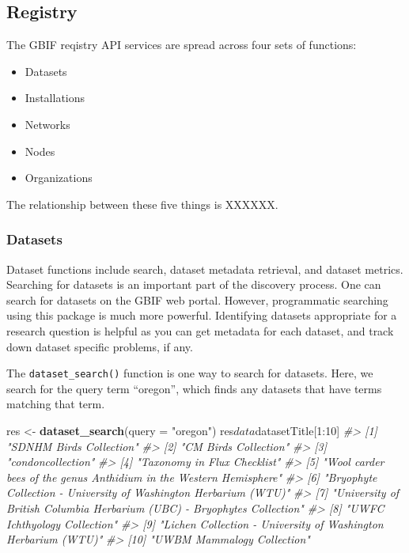 \documentclass[author-year, review, 11pt]{components/elsarticle} %
\newenvironment{Shaded}{\begin{snugshade}}{\end{snugshade}}
\newcommand{\KeywordTok}[1]{\textcolor[rgb]{0.13,0.29,0.53}{\textbf{{#1}}}}
\newcommand{\DataTypeTok}[1]{\textcolor[rgb]{0.13,0.29,0.53}{{#1}}}
\newcommand{\DecValTok}[1]{\textcolor[rgb]{0.00,0.00,0.81}{{#1}}}
\newcommand{\StringTok}[1]{\textcolor[rgb]{0.31,0.60,0.02}{{#1}}}
\newcommand{\CommentTok}[1]{\textcolor[rgb]{0.56,0.35,0.01}{\textit{{#1}}}}
\newcommand{\NormalTok}[1]{{#1}}
\begin{document}
\subsection{Registry}\label{registry}

The GBIF reqistry API services are spread across four sets of functions:

\begin{itemize}
\itemsep1pt\parskip0pt
\item
  Datasets
\item
  Installations
\item
  Networks
\item
  Nodes
\item
  Organizations
\end{itemize}

The relationship between these five things is XXXXXX.

\subsubsection{Datasets}\label{datasets}

Dataset functions include search, dataset metadata retrieval, and
dataset metrics. Searching for datasets is an important part of the
discovery process. One can search for datasets on the GBIF web portal.
However, programmatic searching using this package is much more
powerful. Identifying datasets appropriate for a research question is
helpful as you can get metadata for each dataset, and track down dataset
specific problems, if any.

The \texttt{dataset\_search()} function is one way to search for
datasets. Here, we search for the query term ``oregon'', which finds any
datasets that have terms matching that term.

\begin{Shaded}
\begin{Highlighting}[]
\NormalTok{res <-}\StringTok{ }\KeywordTok{dataset_search}\NormalTok{(}\DataTypeTok{query =} \StringTok{"oregon"}\NormalTok{)}
\NormalTok{res$data$datasetTitle[}\DecValTok{1}\NormalTok{:}\DecValTok{10}\NormalTok{]}
\CommentTok{#>  [1] "SDNHM Birds Collection"                                                }
\CommentTok{#>  [2] "CM Birds Collection"                                                   }
\CommentTok{#>  [3] "condoncollection"                                                      }
\CommentTok{#>  [4] "Taxonomy in Flux Checklist"                                            }
\CommentTok{#>  [5] "Wool carder bees of the genus Anthidium in the Western Hemisphere"     }
\CommentTok{#>  [6] "Bryophyte Collection - University of Washington Herbarium (WTU)"       }
\CommentTok{#>  [7] "University of British Columbia Herbarium (UBC) - Bryophytes Collection"}
\CommentTok{#>  [8] "UWFC Ichthyology Collection"                                           }
\CommentTok{#>  [9] "Lichen Collection - University of Washington Herbarium (WTU)"          }
\CommentTok{#> [10] "UWBM Mammalogy Collection"}
\end{Highlighting}
\end{Shaded}
\end{document}
